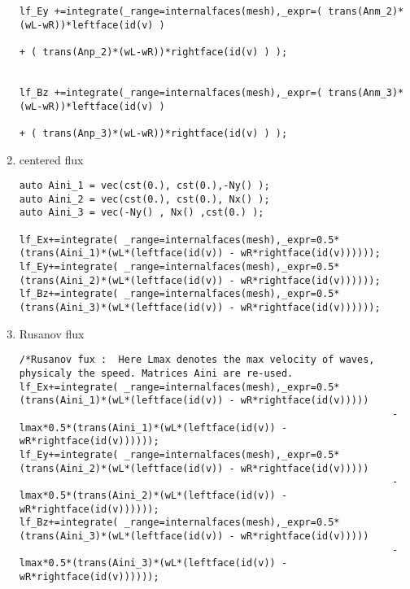 \documentclass[a4paper,oneside,10pt]{report}
\begin{document}
\begin{enumerate}
\begin{center}
\begin{minipage}{\textwidth}
\begin{lstlisting}[label=code2,caption=Upwind flux]
lf_Ey +=integrate(_range=internalfaces(mesh),_expr=( trans(Anm_2)*(wL-wR))*leftface(id(v) )
																		   + ( trans(Anp_2)*(wL-wR))*rightface(id(v) ) );


lf_Bz +=integrate(_range=internalfaces(mesh),_expr=( trans(Anm_3)*(wL-wR))*leftface(id(v) )
																		   + ( trans(Anp_3)*(wL-wR))*rightface(id(v) ) );
\end{lstlisting}
\end{minipage}
\end{center}


\item centered flux

\begin{center}
\begin{minipage}{\textwidth}
\begin{lstlisting}[label=code2,caption=Flux numerique centre]
auto Aini_1 = vec(cst(0.), cst(0.),-Ny() );
auto Aini_2 = vec(cst(0.), cst(0.), Nx() );
auto Aini_3 = vec(-Ny() , Nx() ,cst(0.) );

lf_Ex+=integrate( _range=internalfaces(mesh),_expr=0.5*(trans(Aini_1)*(wL*(leftface(id(v)) - wR*rightface(id(v))))));
lf_Ey+=integrate( _range=internalfaces(mesh),_expr=0.5*(trans(Aini_2)*(wL*(leftface(id(v)) - wR*rightface(id(v))))));
lf_Bz+=integrate( _range=internalfaces(mesh),_expr=0.5*(trans(Aini_3)*(wL*(leftface(id(v)) - wR*rightface(id(v))))));
\end{lstlisting}
\end{minipage}
\end{center}

\item Rusanov flux
\begin{center}
\begin{minipage}{\textwidth}
\begin{lstlisting}[label=code2,caption=Flux numerique de Rusanov]
/*Rusanov fux :  Here Lmax denotes the max velocity of waves, physicaly the speed. Matrices Aini are re-used.
lf_Ex+=integrate( _range=internalfaces(mesh),_expr=0.5*(trans(Aini_1)*(wL*(leftface(id(v)) - wR*rightface(id(v)))))
																- lmax*0.5*(trans(Aini_1)*(wL*(leftface(id(v)) - wR*rightface(id(v))))));
lf_Ey+=integrate( _range=internalfaces(mesh),_expr=0.5*(trans(Aini_2)*(wL*(leftface(id(v)) - wR*rightface(id(v)))))
																- lmax*0.5*(trans(Aini_2)*(wL*(leftface(id(v)) - wR*rightface(id(v))))));
lf_Bz+=integrate( _range=internalfaces(mesh),_expr=0.5*(trans(Aini_3)*(wL*(leftface(id(v)) - wR*rightface(id(v)))))
																- lmax*0.5*(trans(Aini_3)*(wL*(leftface(id(v)) - wR*rightface(id(v))))));
\end{lstlisting}
\end{minipage}
\end{center}

\end{enumerate}
\end{document}
